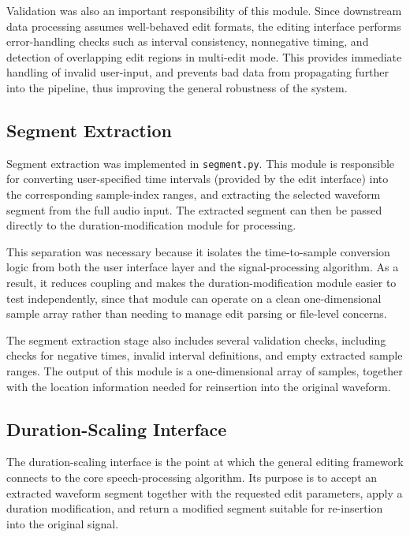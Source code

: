 \documentclass{article}
\begin{document}
Validation was also an important responsibility of this module. Since downstream data processing assumes well-behaved edit formats, the editing interface performs error-handling checks such as interval consistency, nonnegative timing, and detection of overlapping edit regions in multi-edit mode. This provides immediate handling of invalid user-input, and prevents bad data from propagating further into the pipeline, thus improving the general robustness of the system.

\subsection{Segment Extraction}

Segment extraction was implemented in \texttt{segment.py}. This module is responsible for converting user-specified time intervals (provided by the edit interface) into the corresponding sample-index ranges, and extracting the selected waveform segment from the full audio input. The extracted segment can then be passed directly to the duration-modification module for processing.

This separation was necessary because it isolates the time-to-sample conversion logic from both the user interface layer and the signal-processing algorithm. As a result, it reduces coupling and makes the duration-modification module easier to test independently, since that module can operate on a clean one-dimensional sample array rather than needing to manage edit parsing or file-level concerns.

The segment extraction stage also includes several validation checks, including checks for negative times, invalid interval definitions, and empty extracted sample ranges. The output of this module is a one-dimensional array of samples, together with the location information needed for reinsertion into the original waveform.

\subsection{Duration-Scaling Interface}

The duration-scaling interface is the point at which the general editing framework connects to the core speech-processing algorithm. Its purpose is to accept an extracted waveform segment together with the requested edit parameters, apply a duration modification, and return a modified segment suitable for re-insertion into the original signal.
\end{document}
